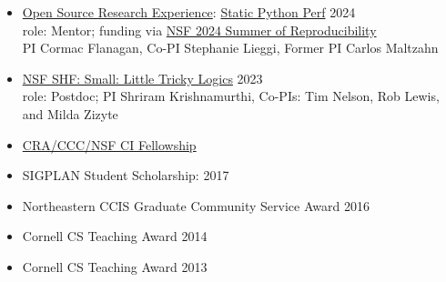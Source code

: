 \documentclass[11pt]{article}
\begin{document}
\begin{itemize}
  \item \href{https://ucsc-ospo.github.io/osre24/}{Open Source Research Experience}: \href{https://ucsc-ospo.github.io/project/osre24/uutah/static-python-perf/}{Static Python Perf} \hfill 2024
    \\ role: Mentor; funding via \href{https://www.nsf.gov/awardsearch/showAward?AWD_ID=2226407&HistoricalAwards=false}{NSF 2024 Summer of Reproducibility}\\
    PI Cormac Flanagan, Co-PI Stephanie Lieggi, Former PI Carlos Maltzahn
  \item \href{https://www.nsf.gov/awardsearch/showAward?AWD_ID=2227863&HistoricalAwards=false}{NSF SHF: Small: Little Tricky Logics} \hfill 2023
    \\ role: Postdoc; PI Shriram Krishnamurthi, Co-PIs: Tim Nelson, Rob Lewis, and Milda Zizyte
  \item \href{https://cifellows2020.org}{CRA/CCC/NSF CI Fellowship} \hfill {}
  \item {SIGPLAN Student Scholarship: \turing{}} \hfill 2017
  \item Northeastern CCIS Graduate Community Service Award \hfill 2016
  \item Cornell CS Teaching Award \hfill 2014
  \item Cornell CS Teaching Award \hfill 2013
\end{itemize}





\end{document}
